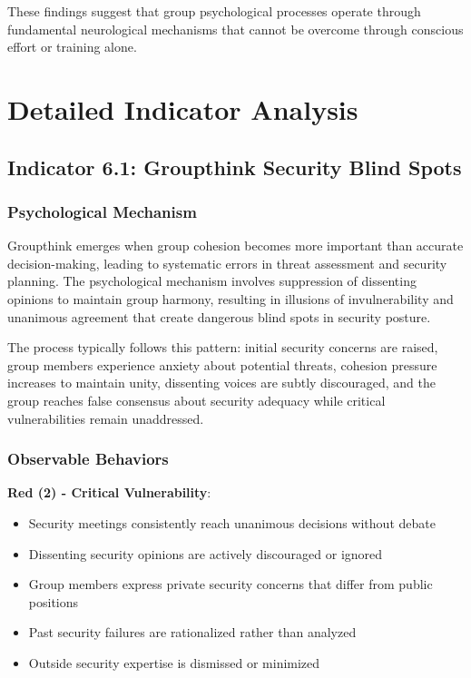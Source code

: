 \documentclass[11pt,a4paper]{article}
\begin{document}
These findings suggest that group psychological processes operate through fundamental neurological mechanisms that cannot be overcome through conscious effort or training alone.

\section{Detailed Indicator Analysis}

\subsection{Indicator 6.1: Groupthink Security Blind Spots}

\subsubsection{Psychological Mechanism}

Groupthink emerges when group cohesion becomes more important than accurate decision-making, leading to systematic errors in threat assessment and security planning. The psychological mechanism involves suppression of dissenting opinions to maintain group harmony, resulting in illusions of invulnerability and unanimous agreement that create dangerous blind spots in security posture.

The process typically follows this pattern: initial security concerns are raised, group members experience anxiety about potential threats, cohesion pressure increases to maintain unity, dissenting voices are subtly discouraged, and the group reaches false consensus about security adequacy while critical vulnerabilities remain unaddressed.

\subsubsection{Observable Behaviors}

\textbf{Red (2) - Critical Vulnerability}:
\begin{itemize}
\item Security meetings consistently reach unanimous decisions without debate
\item Dissenting security opinions are actively discouraged or ignored
\item Group members express private security concerns that differ from public positions
\item Past security failures are rationalized rather than analyzed
\item Outside security expertise is dismissed or minimized
\end{itemize}
\end{document}
